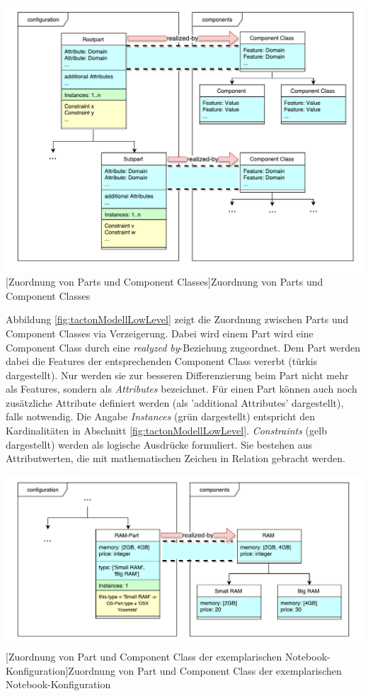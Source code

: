 \documentclass[11pt, a4paper, titlepage, listof=totoc, bibliography=totoc, index=totoc, twoside, openright, headings=normal]{scrreprt}
\begin{document}
\vspace{1em}
\begin{minipage}{\linewidth}
	\centering
	\includegraphics[width=0.8\linewidth]{Abbildungen/tactonModellLowLevel.pdf}
	[Zuordnung von Parts und Component Classes]{Zuordnung von Parts und Component Classes}
	\label{fig:tactonModellLowLevel}
\end{minipage}
\vspace{0.2em}

Abbildung \ref{fig:tactonModellLowLevel} zeigt die Zuordnung zwischen Parts und Component Classes via Verzeigerung. Dabei wird einem Part wird eine Component Class durch eine \emph{realyzed by}-Beziehung zugeordnet. Dem Part werden dabei die Features der entsprechenden Component Class vererbt (türkis dargestellt). Nur werden sie zur besseren Differenzierung beim Part nicht mehr als Features, sondern als \emph{Attributes} bezeichnet. Für einen Part können auch noch zusätzliche Attribute definiert werden (als 'additional Attributes' dargestellt), falls notwendig. Die Angabe \emph{Instances} (grün dargestellt) entspricht den Kardinalitäten in Abschnitt \ref{fig:tactonModellLowLevel}. \emph{Constraints} (gelb dargestellt) werden als logische Ausdrücke formuliert. Sie bestehen aus Attributwerten, die mit mathematischen Zeichen in Relation gebracht werden.

\vspace{1em}
\begin{minipage}{\linewidth}
	\centering
	\includegraphics[width=0.9\linewidth]{Abbildungen/tactonModellLowLevelNotebook.pdf}
	[Zuordnung von Part und Component Class der exemplarischen Notebook-Konfiguration]{Zuordnung von Part und Component Class der exemplarischen Notebook-Konfiguration}
	\label{fig:tactonModellLowLevelNotebook}
\end{minipage}
\end{document}
